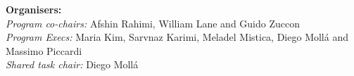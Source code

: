 \documentclass[a4paper,11pt,oneside]{book}
\begin{document}
\clearpage



\vspace*{0.5cm}


\begin{description}

\item{\bf Organisers:}\vspace{1mm} \\
  \emph{Program co-chairs:} Afshin Rahimi, William Lane and Guido Zuccon \\
    \emph{Program Execs:} Maria Kim, Sarvnaz Karimi, Meladel Mistica, Diego Mollá and Massimo Piccardi  \\
    \emph{Shared task chair:} Diego Mollá\\
  

\end{description}
\end{document}
